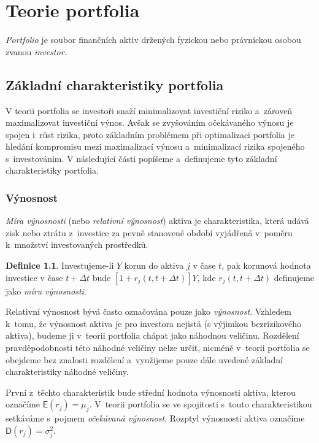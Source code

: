 \documentclass[a4paper,12pt]{report}
\theoremstyle{definition} \newtheorem{definice}[veta]{Definice}
\theoremstyle{remark}
\begin{document}
\chapter{Teorie portfolia}
\textit{Portfolio} je soubor finančních aktiv držených fyzickou nebo právnickou osobou zvanou \textit{investor}.


\section{Základní charakteristiky portfolia}
V teorii portfolia se investoři snaží minimalizovat investiční riziko a~zároveň maximalizovat investiční výnos. 
Avšak se zvyšováním očekávaného výnosu je spojen i~růst rizika, proto základním problémem při optimalizaci portfolia je hledání kompromisu mezi maximalizací výnosu a~minimalizací rizika spojeného s~investováním.  
V následující části popíšeme a~definujeme tyto základní charakteristiky portfolia.

\subsection{Výnosnost}
\textit{Míra výnosnosti} (nebo \textit{relativní výnosnost}) aktiva je charakteristika, která udává zisk nebo ztrátu z~investice za pevně stanovené období vyjádřená v~poměru k~množství investovaných prostředků.

\begin{definice}
Investujeme-li $Y$ korun do aktiva $j$ v čase $t$, pak korunová hodnota investice v čase $t+\Delta t$ bude $[1+r_j(t,t+\Delta t)]Y$, kde  $r_j(t,t+\Delta t)$ definujeme jako \textit{míru výnosnosti}.  
\end{definice}
 
Relativní výnosnost bývá často označována pouze jako \textit{výnosnost}.
Vzhledem k~tomu, že výnosnost aktiva je pro investora nejistá (s výjimkou bezrizikového aktiva), budeme ji v~teorii portfolia chápat jako náhodnou veličinu. %
Rozdělení pravděpodobnosti této náhodné veličiny nelze určit, nicméně v~teorii portfolia se obejdeme bez znalosti rozdělení a~využijeme pouze dále uvedené základní charakteristiky náhodné veličiny.

První z~těchto charakteristik bude střední hodnota výnosnosti aktiva, kterou označíme $\mathsf{E}(r_j)=\mu_j$.
V~teorii portfolia se ve spojitosti s~touto charakteristikou setkáváme s~pojmem \textit{očekávaná výnosnost}.
Rozptyl výnosnosti aktiva označíme $\mathsf{D}(r_j)=\sigma_j^2$.
\end{document}
